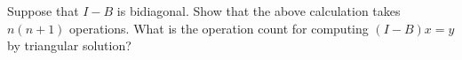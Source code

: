   Suppose that $I-B$ is bidiagonal.  Show that the above calculation
  takes $n(n+1)$ operations. What is the operation count for computing
  $(I-B)x=y$ by triangular solution?
